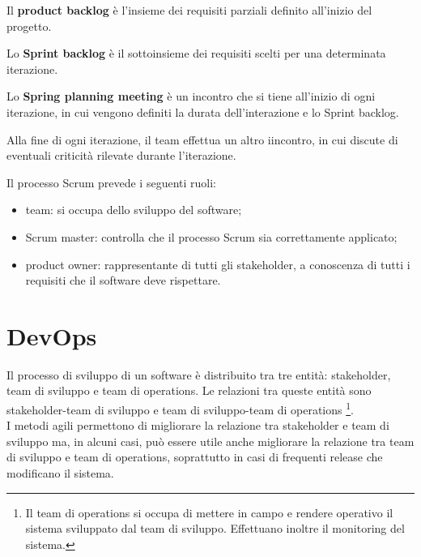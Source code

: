 \begin{defn}
    Il \textbf{product backlog} è l'insieme dei requisiti parziali definito all'inizio del progetto.
\end{defn}

\begin{defn}
    Lo \textbf{Sprint backlog} è il sottoinsieme dei requisiti scelti per una determinata iterazione.
\end{defn}

\begin{defn}
    Lo \textbf{Spring planning meeting} è un incontro che si tiene all'inizio di ogni iterazione, in cui vengono definiti la durata dell'interazione e lo Sprint backlog.
\end{defn}

\begin{rem}
    Alla fine di ogni iterazione, il team effettua un altro iincontro, in cui discute di eventuali criticità rilevate durante l'iterazione.
\end{rem}

Il processo Scrum prevede i seguenti ruoli:
\begin{itemize}
    \item team: si occupa dello sviluppo del software;
    \item Scrum master: controlla che il processo Scrum sia correttamente applicato;
    \item product owner: rappresentante di tutti gli stakeholder, a conoscenza di tutti i requisiti che il software deve rispettare.
\end{itemize}

\section{DevOps}
Il processo di sviluppo di un software è distribuito tra tre entità: stakeholder, team di sviluppo e team di operations. Le relazioni tra queste entità sono stakeholder-team di sviluppo e team di sviluppo-team di operations \footnote{Il team di operations si occupa di mettere in campo e rendere operativo il sistema sviluppato dal team di sviluppo. Effettuano inoltre il monitoring del sistema.}.\\
I metodi agili permettono di migliorare la relazione tra stakeholder e team di sviluppo ma, in alcuni casi, può essere utile anche migliorare la relazione tra team di sviluppo e team di operations, soprattutto in casi di frequenti release che modificano il sistema.

